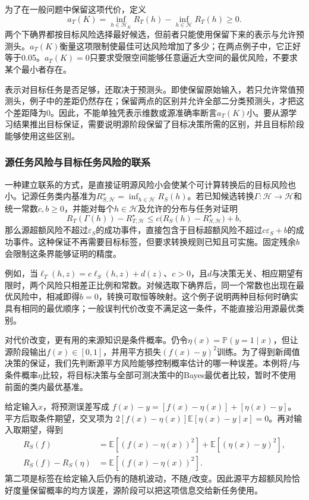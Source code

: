为了在一般问题中保留这项代价，定义
\begin{equation}
 a_T(K)=\inf_{h\in\mathcal H_K}R_T(h)
        -\inf_{h\in\mathcal H}R_T(h)\geq0.
 \label{eq:task-transfer-bias}
\end{equation}
两个下确界都按目标风险选择最好候选，但前者只能使用保留下来的表示与允许预测头。$a_T(K)$衡量这项限制使最佳可达风险增加了多少；在两点例子中，它正好等于0.05。$a_T(K)=0$只要求受限空间能够任意逼近大空间的最优风险，不要求某个最小者存在。

表示对目标任务是否足够，还取决于预测头。即使保留原始输入，若只允许常值预测头，例子中的差距仍然存在；保留两点的区别并允许全部二分类预测头，才把这个差距降为0。因此，不能单独凭表示维数或源准确率断言$a_T(K)$小。要从源学习结果推出目标保证，需要说明源阶段保留了目标决策所需的区别，并且目标阶段能够使用这些区别。

\subsubsection{源任务风险与目标任务风险的联系}

一种建立联系的方式，是直接证明源风险小会使某个可计算转换后的目标风险也小。记源任务类内基准为$R_{S,\mathcal H}^{\star}=\inf_{h\in\mathcal H}R_S(h)$。若已知候选转换$\Gamma:\mathcal H\to\mathcal H$和统一常数$c,b\geq0$，并能对每个$h\in\mathcal H$及允许的分布与任务对证明
\begin{equation}
 R_T(\Gamma(h))-R_{T,\mathcal H}^{\star}
 \leq c\bigl(R_S(h)-R_{S,\mathcal H}^{\star}\bigr)+b,
 \label{eq:task-risk-transfer}
\end{equation}
那么源超额风险不超过$\varepsilon_S$的成功事件，直接包含于目标超额风险不超过$c\varepsilon_S+b$的成功事件。这种保证不再需要目标标签，但要求转换规则已知且可实施。固定残余$b$会限制这条界能够证明的精度。

例如，当$\ell_T(h,z)=c\ell_S(h,z)+d(z)$、$c>0$，且$d$与决策无关、相应期望有限时，两个风险只相差正比例和常数。对候选取下确界后，同一个常数也出现在最优风险中，相减即得$b=0$，转换可取恒等映射。这个例子说明两种目标何时确实具有相同的最优顺序；一般误判代价改变不满足这一条件，不能直接沿用源最优类别。

对代价改变，更有用的来源知识是条件概率。仍令$\eta(x)=\mathbb P(y=1\mid x)$，但让源阶段输出$f(x)\in[0,1]$，并用平方损失$(f(x)-y)^2$训练。为了得到新阈值决策的保证，我们先判断源平方风险能够控制概率估计的哪一种误差。本例将$f$与条件概率$\eta$比较，将目标决策与全部可测决策中的Bayes最优者比较，暂时不使用前面的类内最优基准。

给定输入$x$，将预测误差写成
$f(x)-y=[f(x)-\eta(x)]+[\eta(x)-y]$。平方后取条件期望，交叉项为
$2[f(x)-\eta(x)]\mathbb E[\eta(x)-y\mid x]=0$。再对输入取期望，得到
\[
 \begin{aligned}
 R_S(f)&=\mathbb E[(f(x)-\eta(x))^2]
        +\mathbb E[(\eta(x)-y)^2],\\
 R_S(f)-R_S(\eta)&=\mathbb E[(f(x)-\eta(x))^2].
 \end{aligned}
\]
第二项是标签在给定输入后仍有的随机波动，不随$f$改变。因此源平方超额风险恰好度量保留概率的均方误差，源阶段可以把这项信息交给新任务使用。

